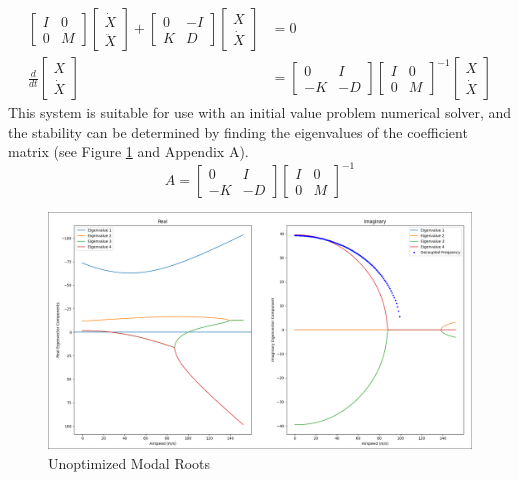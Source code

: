 \documentclass[11pt]{article}
\begin{document}
\begin{align*}
  \begin{bmatrix}
    I&0\\
    0&M
  \end{bmatrix}
  \begin{bmatrix}
    \dot{X}\\
    \ddot{X}
  \end{bmatrix}
  +
  \begin{bmatrix}
    0&-I\\
    K&D
  \end{bmatrix}
  \begin{bmatrix}
    X\\
    \dot{X}
  \end{bmatrix}
  &=0
  \\
  \frac{d}{dt}
  \begin{bmatrix}
    X\\
    \dot{X}
  \end{bmatrix}
  &=
  \begin{bmatrix}
    0&I\\
    -K&-D
  \end{bmatrix}
  \begin{bmatrix}
    I&0\\
    0&M
  \end{bmatrix}^{-1}
  \begin{bmatrix}
    X\\
    \dot{X}
  \end{bmatrix}
\end{align*}
This system is suitable for use with an initial value problem numerical solver, and the stability can be determined by finding the eigenvalues of the coefficient matrix (see Figure \ref{fig:modal_roots} and Appendix A).
$$
  A = 
  \begin{bmatrix}
    0&I \\
    -K&-D
  \end{bmatrix}
  \begin{bmatrix}
    I&0 \\
    0&M
  \end{bmatrix}^{-1}
$$
\begin{figure}[h!]
  \centering
  \includegraphics[width=170mm, trim=3 3 3 3, clip]{modal_roots.png}
  \caption{Unoptimized Modal Roots}\label{fig:modal_roots}
\end{figure}
\end{document}
